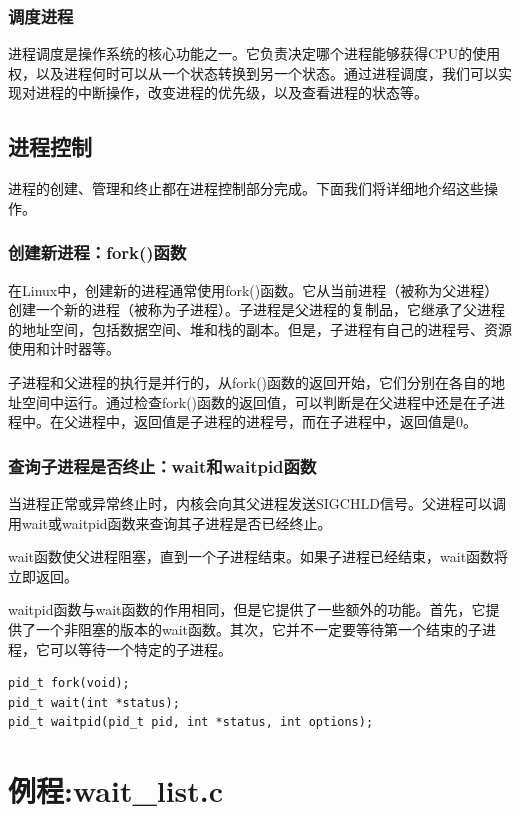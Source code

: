 \documentclass[12pt, a4paper, oneside]{ctexbook}
\numberwithin{figure}{section}
\begin{document}
\subsubsection{调度进程}
进程调度是操作系统的核心功能之一。它负责决定哪个进程能够获得CPU的使用权，以及进程何时可以从一个状态转换到另一个状态。通过进程调度，我们可以实现对进程的中断操作，改变进程的优先级，以及查看进程的状态等。

\subsection{进程控制}
进程的创建、管理和终止都在进程控制部分完成。下面我们将详细地介绍这些操作。

\subsubsection{创建新进程：fork()函数}
在Linux中，创建新的进程通常使用fork()函数。它从当前进程（被称为父进程）创建一个新的进程（被称为子进程）。子进程是父进程的复制品，它继承了父进程的地址空间，包括数据空间、堆和栈的副本。但是，子进程有自己的进程号、资源使用和计时器等。

子进程和父进程的执行是并行的，从fork()函数的返回开始，它们分别在各自的地址空间中运行。通过检查fork()函数的返回值，可以判断是在父进程中还是在子进程中。在父进程中，返回值是子进程的进程号，而在子进程中，返回值是0。

\subsubsection{查询子进程是否终止：wait和waitpid函数}
当进程正常或异常终止时，内核会向其父进程发送SIGCHLD信号。父进程可以调用wait或waitpid函数来查询其子进程是否已经终止。

wait函数使父进程阻塞，直到一个子进程结束。如果子进程已经结束，wait函数将立即返回。

waitpid函数与wait函数的作用相同，但是它提供了一些额外的功能。首先，它提供了一个非阻塞的版本的wait函数。其次，它并不一定要等待第一个结束的子进程，它可以等待一个特定的子进程。

\begin{verbatim}
pid_t fork(void);
pid_t wait(int *status);
pid_t waitpid(pid_t pid, int *status, int options);
\end{verbatim}


\section{例程:wait_list.c}
\end{document}

